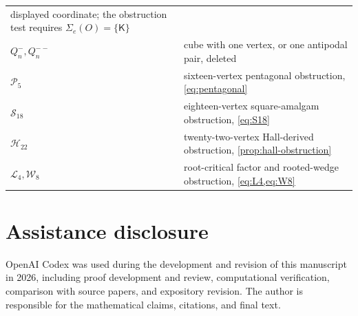 \documentclass[11pt]{article}
\theoremstyle{definition}
\theoremstyle{remark}
\begin{document}
\begin{center}
\begin{tabular}{@{}p{}p{}@{}}
  displayed coordinate; the obstruction test requires
  \(\Sigma_e(O)=\{\boldsymbol{\mathsf K}\}\)\\
\(Q_n^-,Q_n^{--}\) & cube with one vertex, or one antipodal pair, deleted\\
\(\mathcal P_5\) & sixteen-vertex pentagonal obstruction,
  \cref{eq:pentagonal}\\
\(\mathcal S_{18}\) & eighteen-vertex square-amalgam obstruction,
  \cref{eq:S18}\\
\(\mathcal H_{22}\) & twenty-two-vertex Hall-derived obstruction,
  \cref{prop:hall-obstruction}\\
\(\mathcal L_4,\mathcal W_8\) & root-critical factor and rooted-wedge
  obstruction, \cref{eq:L4,eq:W8}\\
\bottomrule
\end{tabular}
\end{center}

\section*{Assistance disclosure}
OpenAI Codex was used during the development and revision of this manuscript
in 2026, including proof development and review, computational verification,
comparison with source papers, and expository revision.  The author is
responsible for the mathematical claims, citations, and final text.


\begingroup
\small

\endgroup
\end{document}
